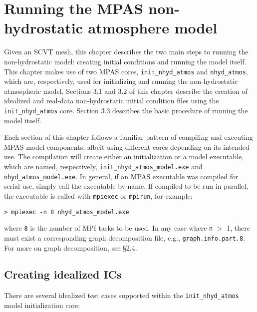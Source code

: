 
\chapter{Running the MPAS non-hydrostatic atmosphere model}

\setlength\LTleft{0.0in}

Given an SCVT mesh, this chapter describes the two main steps to running the non-hydrostatic model: creating initial conditions and running the model itself.  This chapter makes use of two MPAS cores, {\tt init\_nhyd\_atmos} and {\tt nhyd\_atmos}, which are, respectively, used for initializing and running the non-hydrostatic atmospheric model.  Sections 3.1 and 3.2 of this chapter describe the creation of idealized and real-data non-hydrostatic initial condition files using the {\tt init\_nhyd\_atmos} core.   Section 3.3 describes the basic procedure of running the model itself.

Each section of this chapter follows a familiar pattern of compiling and executing MPAS model components, albeit using different cores depending on its intended use.  The compilation will create either an initialization or a model executable, which are named, respectively, {\tt init\_nhyd\_atmos\_model.exe} and {\tt nhyd\_atmos\_model.exe}.  In general, if an MPAS executable was compiled for serial use, simply call the executable by name. If compiled to be run in parallel, the executable is called with {\tt mpiexec} or {\tt mpirun}, for example:

\vspace{12pt}
{\tt > mpiexec -n 8 nhyd\_atmos\_model.exe}
\vspace{12pt}


\noindent where {\tt 8} is the number of MPI tasks to be used.  In any case where {\tt n} $>$ 1, there must exist a corresponding graph decomposition file, e.g., {\tt graph.info.part.8}. For more on graph decomposition, see \S 2.4.  

\section{Creating idealized ICs}

There are several idealized test cases supported within the {\tt init\_nhyd\_atmos} model initialization core:

